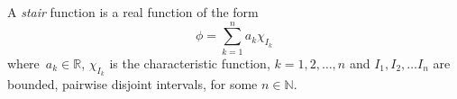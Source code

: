 \documentclass[12pt]{article}
\newcommand{\naturals}{\mathbb{N}}
\begin{document}
A \emph{stair} function is a real function of the form
\begin{equation}
\phi = \sum_{k=1}^{n} a_k \chi_{I_k}
\end{equation}
where \,$a_k \in \mathbb{R}$,\,\,$\chi_{I_k}$ is the characteristic function, $k=1,2,\ldots,n$
and $I_1, I_2,\ldots I_n$ are bounded, pairwise disjoint intervals,
for some $n \in \naturals$.
\end{document}
